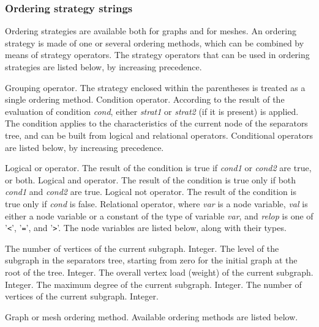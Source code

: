 \subsubsection{Ordering strategy strings}
\label{sec-lib-format-ord}

Ordering strategies are available both for graphs and for meshes.
An ordering strategy is made of one or several ordering methods, which
can be combined by means of strategy operators. The strategy
operators that can be used in ordering strategies are listed below, by
increasing precedence.

\begin{itemize}
\iteme[{\tt (}{\it strat\/}{\tt )}]
Grouping operator.
The strategy enclosed within the parentheses is treated as a single
ordering method.
Condition operator. According to the result of the evaluation of
condition {\it cond}, either {\it strat1\/} or {\it strat2\/} (if it
is present) is applied. The condition applies to the characteristics
of the current node of the separators tree, and can be built from
logical and relational operators. Conditional operators are listed
below, by increasing precedence.
\begin{itemize}
Logical or operator. The result of the condition is true if {\it cond1\/}
or {\it cond2\/} are true, or both.
Logical and operator. The result of the condition is true only if both
{\it cond1\/} and {\it cond2\/} are true.
\iteme[{\tt !}{\it cond}]
Logical not operator. The result of the condition is true only if
{\it cond\/} is false.
Relational operator, where {\it var\/} is a node variable, {\it val\/} is
either a node variable or a constant of the type of variable {\it var}, and
{\it relop\/} is one of '{\tt\verb+<+}', '{\tt\verb+=+}', and '{\tt\verb+>+}'.
The node variables are listed below, along with their types.
\begin{itemize}
\iteme[{\tt edge}]
The number of vertices of the current subgraph.
Integer.
\iteme[{\tt levl}]
The level of the subgraph in the separators tree, starting from zero
for the initial graph at the root of the tree.
Integer.
\iteme[{\tt load}]
The overall vertex load (weight) of the current subgraph.
Integer.
\iteme[{\tt mdeg}]
The maximum degree of the current subgraph.
Integer.
\iteme[{\tt vert}]
The number of vertices of the current subgraph.
Integer.
\end{itemize}
\end{itemize}
\iteme[{\it method\/}{[{\tt \{}{\it parameters\/}{\tt \}}]}]
Graph or mesh ordering method. Available ordering methods are listed
below.
\end{itemize}

